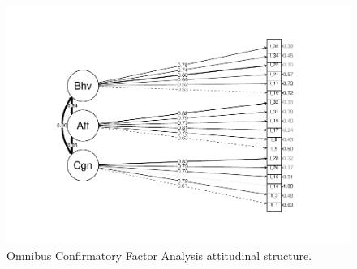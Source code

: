 \documentclass[
  man]{apa6}
\begin{document}
\begin{figure}
\centering
\includegraphics{EngagementPaper_files/figure-latex/semplotatt-1.pdf}
\caption{\label{fig:semplotatt}Omnibus Confirmatory Factor Analysis attitudinal structure.}
\end{figure}
\end{document}
